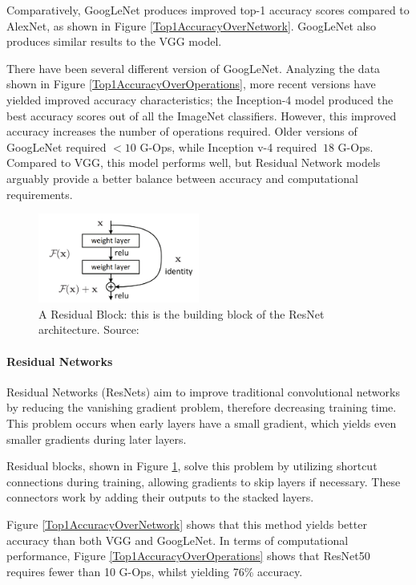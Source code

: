 \documentclass[12pt,a4paper]{article}
\begin{document}
            Comparatively, GoogLeNet produces improved top-1 accuracy scores compared to AlexNet, as shown in Figure \ref{Top1AccuracyOverNetwork}. 
            GoogLeNet also produces similar results to the VGG model.

            There have been several different version of GoogLeNet. Analyzing the data shown in Figure \ref{Top1AccuracyOverOperations}, more recent versions 
            have yielded improved accuracy characteristics; the Inception-4 model produced the best accuracy scores out of all the ImageNet classifiers. However, 
            this improved accuracy increases the number of operations required. Older versions of GoogLeNet required $<10$ G-Ops, while Inception v-4 required $~18$ G-Ops.
            Compared to VGG, this model performs well, but Residual Network models arguably provide a better balance between accuracy and computational requirements.
            \begin{figure}
                \centering
                \includegraphics[width=200px]{ResidualBlock.png}
                \caption{A Residual Block: this is the building block of the ResNet architecture. Source: \cite{DeepResidualNetworks}}
                \label{ResidualBlock}
            \end{figure}
            \paragraph{Residual Networks}
            Residual Networks (ResNets) aim to improve traditional convolutional networks by reducing the vanishing gradient problem, therefore decreasing training time.
            This problem occurs when early layers have a small gradient, which yields even smaller gradients during later layers. 

            Residual blocks, shown in Figure \ref{ResidualBlock}, solve this problem by utilizing shortcut connections during training, allowing gradients to skip layers if necessary. 
            These connectors work by adding their outputs to the stacked layers.

            Figure \ref{Top1AccuracyOverNetwork} shows that this method yields better accuracy than both VGG and GoogLeNet. In terms of computational performance, 
            Figure \ref{Top1AccuracyOverOperations} shows that ResNet50 requires fewer than 10 G-Ops, whilst yielding 76\% accuracy.
\end{document}

